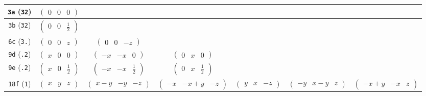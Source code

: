 \documentclass[fleqn,9pt,landscape]{jsarticle}
\begin{document}
\begin{center}
\begin{longtable}{ccccccc}
{\tt 3a} ({\tt 32}) & $ \begin{pmatrix} 0 & 0 & 0 \end{pmatrix} $ & $  $ & $  $ & $  $ & $  $ & $  $ \\ \hline
{\tt 3b} ({\tt 32}) & $ \begin{pmatrix} 0 & 0 & \frac{1}{2} \end{pmatrix} $ & $  $ & $  $ & $  $ & $  $ & $  $ \\ \hline
{\tt 6c} ({\tt 3.}) & $ \begin{pmatrix} 0 & 0 & z \end{pmatrix} $ & $ \begin{pmatrix} 0 & 0 & - z \end{pmatrix} $ & $  $ & $  $ & $  $ & $  $ \\ \hline
{\tt 9d} ({\tt .2}) & $ \begin{pmatrix} x & 0 & 0 \end{pmatrix} $ & $ \begin{pmatrix} - x & - x & 0 \end{pmatrix} $ & $ \begin{pmatrix} 0 & x & 0 \end{pmatrix} $ & $  $ & $  $ & $  $ \\ \hline
{\tt 9e} ({\tt .2}) & $ \begin{pmatrix} x & 0 & \frac{1}{2} \end{pmatrix} $ & $ \begin{pmatrix} - x & - x & \frac{1}{2} \end{pmatrix} $ & $ \begin{pmatrix} 0 & x & \frac{1}{2} \end{pmatrix} $ & $  $ & $  $ & $  $ \\ \hline
{\tt 18f} ({\tt 1}) & $ \begin{pmatrix} x & y & z \end{pmatrix} $ & $ \begin{pmatrix} x - y & - y & - z \end{pmatrix} $ & $ \begin{pmatrix} - x & - x + y & - z \end{pmatrix} $ & $ \begin{pmatrix} y & x & - z \end{pmatrix} $ & $ \begin{pmatrix} - y & x - y & z \end{pmatrix} $ & $ \begin{pmatrix} - x + y & - x & z \end{pmatrix} $ \\
\end{longtable}
\end{center}
\end{document}

